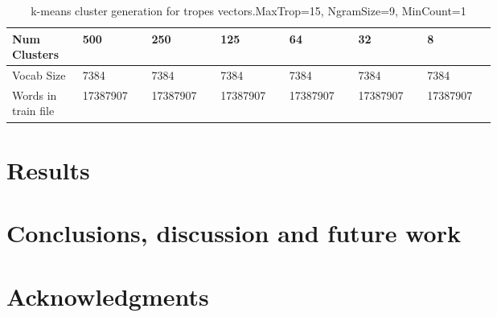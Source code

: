 \documentclass[letterpaper]{article}
\begin{document}
	\begin{table}[ht]
		\centering
		\begin{tabular}{|p{0.1\linewidth}|p{0.1\linewidth}|p{0.1\linewidth}|p{0.1\linewidth}|p{0.1\linewidth}|p{0.1\linewidth}|p{0.1\linewidth}|}
			\hline
			\textbf{Num Clusters}& \textbf{500} & \textbf{250} & \textbf{125} & \textbf{64} & \textbf{32} & \textbf{8}\\
			\hline
			\hline
			Vocab Size& 7384 & 7384 & 7384 & 7384 & 7384 & 7384\\
			\hline
			Words in train file& 17387907 & 17387907 & 17387907 & 17387907 & 17387907 & 17387907\\
			\hline
			
		\end{tabular}
		\caption{k-means cluster generation for tropes vectors.MaxTrop=15, NgramSize=9, MinCount=1}
		\label{tab:k-means-clusters}
	\end{table}	
	
	
	
	\section{Results}
	\label{sec:res}
	
	\section{Conclusions, discussion and future work}
	
	
	\section{Acknowledgments}
	
	
	
	
\end{document}
